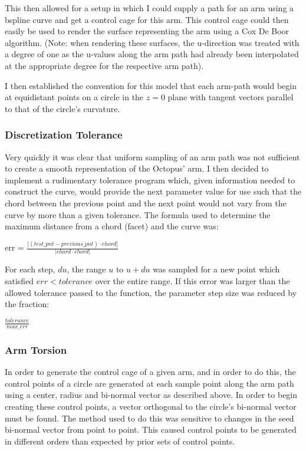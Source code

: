 \documentclass[twocolumn]{article}
\begin{document}
This then allowed for a setup in which I could supply a path for an arm using a bspline curve and get a control cage for this arm. This control cage could then easily be used to render the surface representing the arm using a Cox De Boor algorithm. (Note: when rendering these surfaces, the u-direction was treated with a degree of one as the u-values along the arm path had already been interpolated at the appropriate degree for the respective arm path).

I then established the convention for this model that each arm-path would begin at equidistant points on a circle in the $z=0$ plane with tangent vectors parallel to that of the circle's curvature.

\subsubsection{Discretization Tolerance}

Very quickly it was clear that uniform sampling of an arm path was not sufficient to create a smooth representation of the Octopus' arm. I then decided to implement a rudimentary tolerance program which, given information needed to construct the curve, would provide the next parameter value for use such that the chord between the previous point and the next point would not vary from the curve by more than a given tolerance. The formula used to determine the maximum distance from a chord (facet) and the curve was:

\begin{center}
{err = $\frac{|(test\_pnt-previous\_pnt) \cdot chord|}{|chord \cdot chord|}$}
\end{center}

For each step, $du$, the range $u$ to $u+du$ was sampled for a new point which satisfied $err < tolerance$ over the entire range. If this error was larger than the allowed tolerance passed to the function, the parameter step size was reduced by the fraction:

\begin{center}
$ \frac{tolerance}{max\_err} $
\end{center}

\subsubsection{Arm Torsion}

In order to generate the control cage of a given arm, and in order to do this, the control points of a circle are generated at each sample point along the arm path using a center, radius and bi-normal vector as described above. In order to begin creating these control points, a vector orthogonal to the circle's bi-normal vector must be found. The method used to do this was sensitive to changes in the seed bi-normal vector from point to point. This caused control points to be generated in different orders than expected by prior sets of control points.
\end{document}

